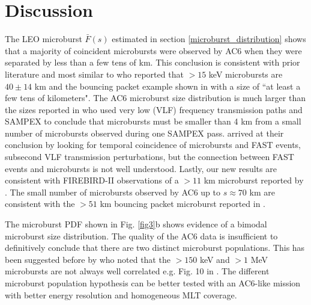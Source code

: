 \documentclass[draft]{agujournal2019}
\begin{document}
\section{Discussion}
The LEO microburst $\bar{F}(s)$ estimated in section \ref{microburst_distribution} shows that a majority of coincident microbursts were observed by AC6 when they were separated by less than a few tens of km. This conclusion is consistent with prior literature and most similar to  who reported that $> 15$ keV microbursts are $40 \pm 14$ km and the bouncing packet example shown in  with a size of ``at least a few tens of kilometers". The AC6 microburst size distribution is much larger than the sizes reported in  who used very low (VLF) frequency transmission paths and SAMPEX to conclude that microbursts must be smaller than 4 km from a small number of microbursts observed during one SAMPEX pass.  arrived at their conclusion by looking for temporal coincidence of microbursts and FAST events, subsecond VLF transmission perturbations, but the connection between FAST events and microbursts is not well understood. Lastly, our new results are consistent with FIREBIRD-II observations of a $> 11$ km microburst reported by . The small number of microbursts observed by AC6 up to $s \approx 70$ km are consistent with the $> 51$ km bouncing packet microburst reported in . 

The microburst PDF shown in Fig. \ref{fig3}b shows evidence of a bimodal microburst size distribution. The quality of the AC6 data is insufficient to definitively conclude that there are two distinct microburst populations. This has been suggested before by  who noted that the $> 150$ keV and $> 1$ MeV microbursts are not always well correlated e.g. Fig. 10 in . The different microburst population hypothesis can be better tested with an AC6-like mission with better energy resolution and homogeneous MLT coverage.
\end{document}
